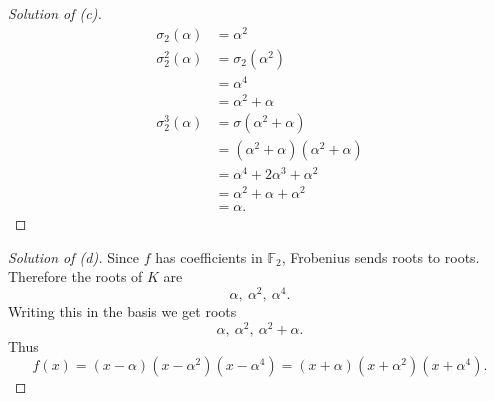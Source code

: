 \begin{proof}[Solution of (c)]
    \begin{align*}
        \sigma_2(\alpha) &= \alpha^2 \\ 
        \sigma_2^2(\alpha) &= \sigma_2(\alpha^2) \\ 
                           &= \alpha^4 \\ 
                           &= \alpha^2 + \alpha \\ 
        \sigma_2^3(\alpha) &= \sigma(\alpha^2 + \alpha) \\ 
                           &= (\alpha^2 + \alpha)(\alpha^2 + \alpha)
                           \\ 
                           &= \alpha^4 + 2\alpha^3 + \alpha^2 \\ 
                           &= \alpha^2 + \alpha + \alpha^2 \\ 
                           &= \alpha.
    \end{align*}
\end{proof}
\begin{proof}[Solution of (d)]
    Since $f$ has coefficients in $\mathbb F_2$, Frobenius 
    sends roots to roots. Therefore the roots of $K$ are 
    \[
        \alpha, \ \alpha^2, \ \alpha^4.
    \]
    Writing this in the basis we get roots 
    \[
        \alpha, \ \alpha^2, \ \alpha^2 + \alpha.
    \]
    Thus 
    \[
        f(x) = (x-\alpha)(x-\alpha^2)(x-\alpha^4) 
        = (x+\alpha)(x+\alpha^2)(x+\alpha^4).
    \]
\end{proof}

